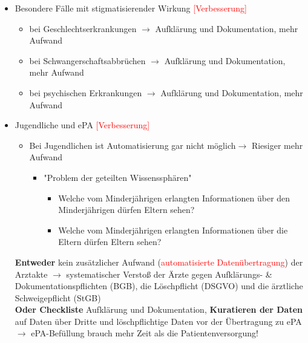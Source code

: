 \documentclass[a4paper]{assignment}
\begin{document}
\begin{problemlist}
\begin{enumerate}
\begin{itemize}
\item Besondere Fälle mit stigmatisierender Wirkung \textcolor{red}{[Verbesserung]}

\begin{itemize}
\item bei Geschlechtserkrankungen $\rightarrow$ Aufklärung und Dokumentation, mehr Aufwand
\item bei Schwangerschaftsabbrüchen $\rightarrow$ Aufklärung und Dokumentation, mehr Aufwand
\item bei psychischen Erkrankungen $\rightarrow$ Aufklärung und Dokumentation, mehr Aufwand
\end{itemize}

\item Jugendliche und ePA \textcolor{red}{[Verbesserung]}

\begin{itemize}
\item Bei Jugendlichen ist Automatisierung gar nicht möglich$\rightarrow$ Riesiger mehr Aufwand
\begin{itemize}
	\item "Problem der geteilten Wissenssphären"
	\begin{itemize}
		\item Welche vom Minderjährigen erlangten Informationen über den Minderjährigen dürfen Eltern sehen?
		\item Welche vom Minderjährigen erlangten Informationen über die Eltern dürfen Eltern sehen?
	\end{itemize}
\end{itemize}
\end{itemize}

\newpage
\begin{answer}
\textbf{Entweder} kein zusätzlicher Aufwand (\textcolor{red}{automatisierte Datenübertragung}) der Arztakte $\rightarrow$ systematischer Verstoß der Ärzte gegen Aufklärungs- \& Dokumentationspflichten (BGB), die Löschpflicht (DSGVO) und die ärztliche Schweigepflicht (StGB) \\
\textbf{Oder Checkliste} Aufklärung und Dokumentation, \textbf{Kuratieren der Daten} auf Daten über Dritte und löschpflichtige Daten vor der Übertragung zu ePA \\
$\rightarrow$ ePA-Befüllung brauch mehr Zeit als die Patientenversorgung!
\end{answer}
\end{itemize}



\end{enumerate}
\end{problemlist}
\end{document}
